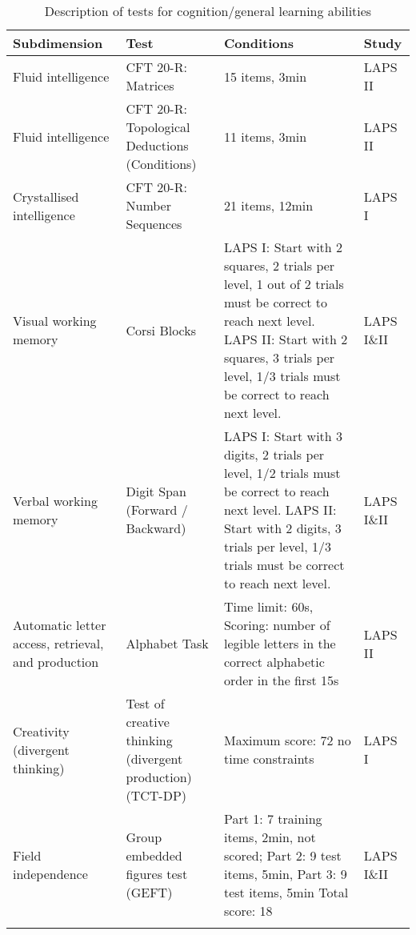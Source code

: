 \documentclass[output=paper]{langsci/langscibook}
\begin{document}
\begin{table}\footnotesize
\begin{tabularx}{\textwidth}{QQQl}
\lsptoprule
{Subdimension} & {Test} & {Conditions} & {Study}\\\midrule
Fluid intelligence & CFT 20-R: Matrices \citep{Weiss2006} & 15 items, 3min & LAPS II\\
Fluid intelligence & CFT 20-R: Topological Deductions (Conditions) \citep{Weiss2006} & 11 items, 3min & LAPS II\\
Crystallised intelligence & CFT 20-R: Number Sequences \citep{Weiss2006} & 21 items, 12min & LAPS I\\
Visual working memory & Corsi Blocks & LAPS I: Start with 2 squares, 2 trials per level, 1 out of 2 trials must be correct to reach next level. LAPS II: Start with 2 squares, 3 trials per level, 1/3 trials must be correct to reach next level. & LAPS I\&II\\
Verbal working memory & Digit Span (Forward / Backward) & LAPS I: Start with 3 digits, 2 trials per level, 1/2 trials must be correct to reach next level. LAPS II: Start with 2 digits, 3 trials per level, 1/3 trials must be correct to reach next level. & LAPS I\&II\\
Automatic letter access, retrieval, and production & Alphabet Task \citep{BerningerEtAl1992} & Time limit: 60s, Scoring: number of legible letters in the correct alphabetic order in the first 15s & LAPS II\\
Creativity (divergent thinking) & Test of creative thinking (divergent production) (TCT-DP) \citep{UrbanJellen1995} & Maximum score: 72 no time constraints & LAPS I\\
Field independence & Group embedded figures test (GEFT) \citep{WitkinEtAl2014} & Part 1: 7 training items, 2min, not scored; Part 2: 9 test items, 5min, Part 3: 9 test items, 5min
Total score: 18 & LAPS I\&II\\
\lspbottomrule
\end{tabularx}
\caption{Description of tests for cognition/general learning abilities}
\end{table}
\end{document}
